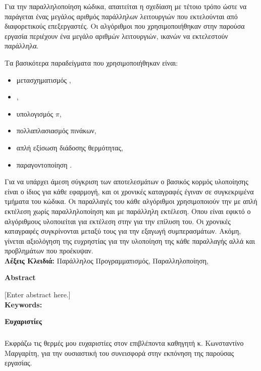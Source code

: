 Για την παραλληλοποίηση κώδικα, απαιτείται η σχεδίαση με τέτοιο τρόπο ώστε να παράγεται ένας μεγάλος αριθμός παράλληλων λειτουργιών που εκτελούνται από διαφορετικούς επεξεργαστές. Οι  αλγόριθμοι που χρησιμοποιήθηκαν στην παρούσα εργασία περιέχουν ένα μεγάλο αριθμών λειτουργιών, ικανών να εκτελεστούν παράλληλα. 

Τα βασικότερα παραδείγματα που χρησιμοποιήθηκαν είναι:
\begin{itemize}
    \item μετασχηματισμός , 
    \item {},
    \item υπολογισμός $\pi$, 
    \item πολλαπλασιασμός πινάκων,
    \item απλή εξίσωση διάδοσης θερμότητας,
    \item παραγοντοποίηση .
\end{itemize}

     
Για να υπάρχει άμεση σύγκριση των αποτελεσμάτων ο βασικός κορμός υλοποίησης είναι ο ίδιος για κάθε εφαρμογή, και οι χρονικές καταγραφές έγιναν σε συγκεκριμένα τμήματα του κώδικα. Οι παραλλαγές του κάθε αλγόριθμοι χρησιμοποιούν την  με απλή εκτέλεση χωρίς παραλληλοποίηση και με παράλληλη εκτέλεση. Οπου είναι εφικτό ο αλγόριθμους υλοποιείται  για εκτέλεση στην  για την επίλυση του. Οι χρονικές καταγραφές συγκρίνονται μεταξύ τους για την εξαγωγή συμπερασμάτων. Ακόμη, γίνεται αξιολόγηση της ευχρηστίας για την υλοποίηση της κάθε παραλλαγής αλλά και προβλημάτων που προέκυψαν.\\[1 cm]

\indent \textbf{Λέξεις Κλειδιά:}
Παράλληλος Προγραμματισμός, Παραλληλοποίηση, 

\clearpage
{}
\begin{flushleft}

{\large \textbf{Abstract}}\\[0.5 cm]
\end{flushleft}
[Enter abstract here.]\\[1 cm]
\indent \textbf{Keywords:}

\clearpage
{}
\begin{flushleft}
{\large \textbf{Ευχαριστίες}}\\[0.5 cm]
\end{flushleft}
\subparagraph{}
Εκφράζω τις θερμές μου ευχαριστίες στον επιβλέποντα καθηγητή κ. Κωνσταντίνο Μαργαρίτη, για την ουσιαστική του συνεισφορά στην εκπόνηση της παρούσας εργασίας.

\clearpage
\singlespacing
\tableofcontents
{}

\renewcommand{\listfigurename}{Κατάλογος Εικόνων (αν υπάρχουν)}
\clearpage
\listoffigures

\renewcommand{\listtablename}{Κατάλογος Πινάκων (αν υπάρχουν)}
\clearpage
\listoftables

\clearpage
\begin{flushleft}
\lstlistoflistings
\end{flushleft}

\clearpage
\setcounter{page}{1}
